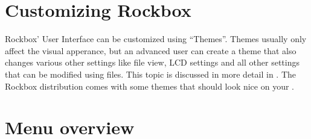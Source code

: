 \section{Customizing Rockbox}
Rockbox' User Interface can be customized using ``Themes''. Themes usually
only affect the visual apperance, but an advanced user can create a theme
that also changes various other settings like file view, LCD settings and
all other settings that can be modified using  files. This topic
is discussed in more detail in .
The Rockbox distribution comes with some themes that should look nice on
your \dap{}. 

\section{Menu overview}
%

